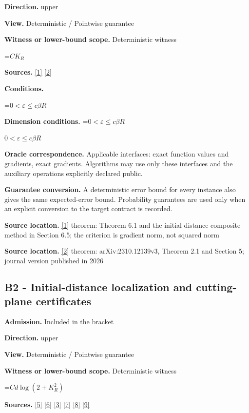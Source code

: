\documentclass[10pt,a4paper]{article}
\newcommand{\AtlasMath}[1]{\par\begingroup\centering\setbox0=\hbox{$\displaystyle #1$}\ifdim\wd0>1.4\linewidth\typeout{ATLAS WIDE FORMULA: \the\wd0}\fi\ifdim\wd0>\linewidth\resizebox{\linewidth}{!}{\box0}\else\box0\fi\par\endgroup}
\newcommand{\AtlasInlineMath}[1]{\begingroup\setbox0=\hbox{$#1$}\ifdim\wd0>.4\linewidth\endgroup\AtlasMath{#1}\else\endgroup$#1$\fi}
\begin{document}
\textbf{Direction.} upper

\textbf{View.} Deterministic / Pointwise guarantee

\textbf{Witness or lower-bound scope.} Deterministic witness

\AtlasMath{CK_R}
\textbf{Sources.} \href{https://arxiv.org/pdf/1803.06600v4}{[1]} \href{https://doi.org/10.1007/s10107-026-02352-2}{[2]}

\textbf{Conditions.} 
\AtlasMath{0<\varepsilon\le c\beta R}


\textbf{Dimension conditions.} \AtlasInlineMath{0<\varepsilon\le c\beta R}

\textbf{Oracle correspondence.} Applicable interfaces: exact function values and gradients, exact gradients. Algorithms may use only these interfaces and the auxiliary operations explicitly declared public.

\textbf{Guarantee conversion.} A deterministic error bound for every instance also gives the same expected-error bound. Probability guarantees are used only when an explicit conversion to the target contract is recorded.

\textbf{Source location.} \href{https://arxiv.org/pdf/1803.06600v4}{[1]} theorem: Theorem 6.1 and the initial-distance composite method in Section 6.5; the criterion is gradient norm, not squared norm

\textbf{Source location.} \href{https://doi.org/10.1007/s10107-026-02352-2}{[2]} theorem: arXiv:2310.12139v3, Theorem 2.1 and Section 5; journal version published in 2026

\subsection{B2 - Initial-distance localization and cutting-plane certificates}
\textbf{Admission.} Included in the bracket

\textbf{Direction.} upper

\textbf{View.} Deterministic / Pointwise guarantee

\textbf{Witness or lower-bound scope.} Deterministic witness

\AtlasMath{C d\log(2+K_R^2)}
\textbf{Sources.} \href{https://arxiv.org/pdf/2101.09740v2}{[5]} \href{https://arxiv.org/pdf/2609.33360v2}{[6]} \href{https://arxiv.org/pdf/2609.10874}{[3]} \href{https://arxiv.org/pdf/1405.4980}{[7]} \href{https://www2.isye.gatech.edu/~nemirovs/MOR_AccuracyCertificates.pdf}{[8]} \href{https://arxiv.org/pdf/2609.20701}{[9]}
\end{document}
